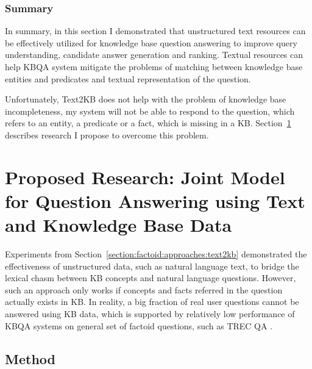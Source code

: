 \subsubsection{Summary}
\label{section:factoid:approaches:text2kb:summary}

In summary, in this section I demonstrated that unstructured text resources can be effectively utilized for knowledge base question answering to improve query understanding, candidate answer generation and ranking.
Textual resources can help KBQA system mitigate the problems of matching between knowledge base entities and predicates and textual representation of the question.

Unfortunately, Text2KB does not help with the problem of knowledge base incompleteness, \ie my system will not be able to respond to the question, which refers to an entity, a predicate or a fact, which is missing in a KB.
Section~\ref{section:factoid:proposal} describes research I propose to overcome this problem.


\section{Proposed Research: Joint Model for Question Answering using Text and Knowledge Base Data}
\label{section:factoid:proposal}

Experiments from Section~\ref{section:factoid:approaches:text2kb} demonstrated the effectiveness of unstructured data, such as natural language text, to bridge the lexical chasm between KB concepts and natural language questions.
However, such an approach only works if concepts and facts referred in the question actually exists in KB.
In reality, a big fraction of real user questions cannot be answered using KB data, which is supported by relatively low performance of KBQA systems on general set of factoid questions, such as TREC QA \cite{Sun:2015:ODQ:2736277.2741651}.



\subsection{Method}
\label{section:factoid:proposal:method}

